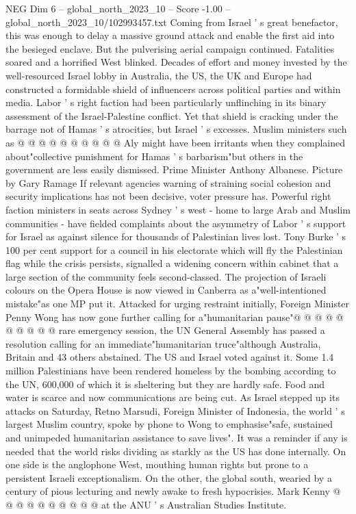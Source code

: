 \begin{textsample}{NEG Dim 6 – global\_north\_2023\_10 – Score -1.00 – global\_north\_2023\_10/102993457.txt}
Coming from Israel ' s great benefactor, this was enough to delay a massive ground attack and enable the first aid into the besieged enclave.
But the pulverising aerial campaign continued.
Fatalities soared and a horrified West blinked.
Decades of effort and money invested by the well-resourced Israel lobby in Australia, the US, the UK and Europe had constructed a formidable shield of influencers across political parties and within media.
Labor ' s right faction had been particularly unflinching in its binary assessment of the Israel-Palestine conflict.
Yet that shield is cracking under the barrage not of Hamas ' s atrocities, but Israel ' s excesses.
Muslim ministers such as @ @ @ @ @ @ @ @ @ @ Aly might have been irritants when they complained about"collective punishment for Hamas ' s barbarism"but others in the government are less easily dismissed.
Prime Minister Anthony Albanese.
Picture by Gary Ramage If relevant agencies warning of straining social cohesion and security implications has not been decisive, voter pressure has.
Powerful right faction ministers in seats across Sydney ' s west - home to large Arab and Muslim communities - have fielded complaints about the asymmetry of Labor ' s support for Israel as against silence for thousands of Palestinian lives lost.
Tony Burke ' s 100 per cent support for a council in his electorate which will fly the Palestinian flag while the crisis persists, signalled a widening concern within cabinet that a large section of the community feels second-classed.
The projection of Israeli colours on the Opera House is now viewed in Canberra as a"well-intentioned mistake"as one MP put it.
Attacked for urging restraint initially, Foreign Minister Penny Wong has now gone further calling for a"humanitarian pause"@ @ @ @ @ @ @ @ @ @ rare emergency session, the UN General Assembly has passed a resolution calling for an immediate"humanitarian truce"although Australia, Britain and 43 others abstained.
The US and Israel voted against it.
Some 1.4 million Palestinians have been rendered homeless by the bombing according to the UN, 600,000 of which it is sheltering but they are hardly safe.
Food and water is scarce and now communications are being cut.
As Israel stepped up its attacks on Saturday, Retno Marsudi, Foreign Minister of Indonesia, the world ' s largest Muslim country, spoke by phone to Wong to emphasise"safe, sustained and unimpeded humanitarian assistance to save lives".
It was a reminder if any is needed that the world risks dividing as starkly as the US has done internally.
On one side is the anglophone West, mouthing human rights but prone to a persistent Israeli exceptionalism.
On the other, the global south, wearied by a century of pious lecturing and newly awake to fresh hypocrisies.
Mark Kenny @ @ @ @ @ @ @ @ @ @ at the ANU ' s Australian Studies Institute.

\end{textsample}
